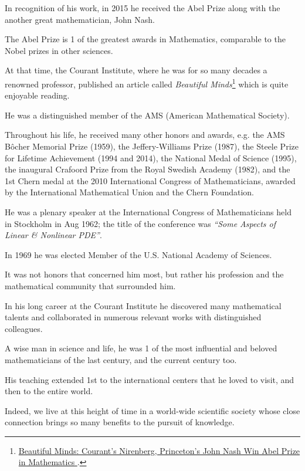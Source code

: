 \documentclass{article}
\begin{document}
%
In recognition of his work, in 2015 he received the Abel Prize along with the another great mathematician, John Nash.

The Abel Prize is 1 of the greatest awards in Mathematics, comparable to the Nobel prizes in other sciences.

At that time, the Courant Institute, where he was for so many decades a renowned professor, published an article called \textit{Beautiful Minds}\footnote{\href{https://www.nyu.edu/about/news-publications/news/2015/march/beautiful-minds-courantsnirenberg-princetons-john-nash-win-abel-prize-in-mathematics-.html}{Beautiful Minds: Courant's Nirenberg, Princeton's John Nash Win Abel Prize in Mathematics }.} which is quite enjoyable reading.

%
He was a distinguished member of the AMS (American Mathematical Society).

Throughout his life, he received many other honors and awards, e.g. the AMS B\^ocher Memorial Prize (1959), the Jeffery-Williams Prize (1987), the Steele Prize for Lifetime Achievement (1994 and 2014), the National Medal of Science (1995), the inaugural Crafoord Prize from the Royal Swedish Academy (1982), and the 1st Chern medal at the 2010 International Congress of Mathematicians, awarded by the International Mathematical Union and the Chern Foundation.

He was a plenary speaker at the International Congress of Mathematicians held in Stockholm in Aug 1962; the title of the conference was \textit{``Some Aspects of Linear \& Nonlinear PDE''}.

In 1969 he was elected Member of the U.S. National Academy of Sciences.

%
It was not honors that concerned him most, but rather his profession and the mathematical community that surrounded him.

In his long career at the Courant Institute he discovered many mathematical talents and collaborated in numerous relevant works with distinguished colleagues.

A wise man in science and life, he was 1 of the most influential and beloved mathematicians of the last century, and the current century too.

His teaching extended 1st to the international centers that he loved to visit, and then to the entire world.

Indeed, we live at this height of time in a world-wide scientific society whose close connection brings so many benefits to the pursuit of knowledge.
\end{document}
